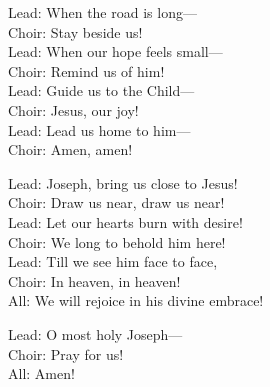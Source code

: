 \begin{lyrics}
Lead: When the road is long—\\
Choir: Stay beside us!\\
Lead: When our hope feels small—\\
Choir: Remind us of him!\\
Lead: Guide us to the Child—\\
Choir: Jesus, our joy!\\
Lead: Lead us home to him—\\
Choir: Amen, amen!

Lead: Joseph, bring us close to Jesus!\\
Choir: Draw us near, draw us near!\\
Lead: Let our hearts burn with desire!\\
Choir: We long to behold him here!\\
Lead: Till we see him face to face,\\
Choir: In heaven, in heaven!\\
All: We will rejoice in his divine embrace!

Lead: O most holy Joseph—\\
Choir: Pray for us!\\
All: Amen!
\end{lyrics}

